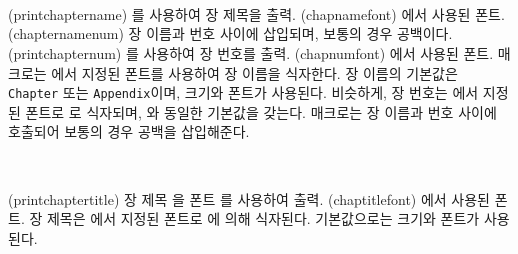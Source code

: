 \begin{syntax}
\cmd{\printchaptername} \cmd{\chapnamefont} \\
\cmd{\chapternamenum} \\
\cmd{\printchapternum} \cmd{\chapnumfont} \\
\end{syntax}
\glossary(printchaptername)%
  {}%
  {를 사용하여 장 제목을 출력.}
\glossary(chapnamefont)%
  {}%
  {에서 사용된 폰트.}
\glossary(chapternamenum)%
  {}%
  {장 이름과 번호 사이에 삽입되며, 보통의 경우 공백이다.}
\glossary(printchapternum)%
  {}%
  {를 사용하여 장 번호를 출력.}
\glossary(chapnumfont)%
  {}%
  {에서 사용된 폰트.}
\cmd{\printchaptername} 매크로는 \cmd{\chapnamefont}에서 지정된
폰트를 사용하여 장 이름을 식자한다.
장 이름의 기본값은 \texttt{Chapter} 또는 \texttt{Appendix}이며,
\cmd{\huge} 크기와 \cmd{\bfseries} 폰트가 사용된다.
비슷하게, 장 번호는 \cmd{\chapnumfont}에서 지정된 폰트로
\cmd{\printchapternum}로 식자되며,
\cmd{\chapnamefont}와 동일한 기본값을 갖는다.
\cmd{\chapternamenum} 매크로는 장 이름과 번호 사이에 호출되어
보통의 경우 공백을 삽입해준다.

\begin{syntax}
\cmd{\printchaptertitle} \cmd{\chaptitlefont} \\
\end{syntax}
\glossary(printchaptertitle)%
  {}%
  {장 제목 을 폰트 를 사용하여 출력.}
\glossary(chaptitlefont)%
  {}%
  {에서 사용된 폰트.}
장 제목은 \cmd{\chaptitlefont}에서 지정된 폰트로
\cmd{\printchaptertitle}에 의해 식자된다.
기본값으로는 \cmd{\Huge} 크기와 \cmd{\bfseries} 폰트가 사용된다.

